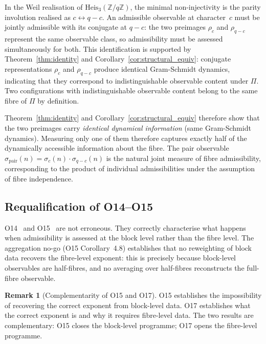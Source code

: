 \documentclass[11pt,a4paper]{article}
\theoremstyle{definition}
\newtheorem{remark}[theorem]{Remark}
\newcommand{\Heis}{\mathrm{Heis}_3}
\newcommand{\ZqZ}{\mathbb{Z}/q\mathbb{Z}}
\begin{document}
      In the Weil realisation of $\Heis(\ZqZ)$, the minimal non-injectivity
      is the parity involution realised as $c \leftrightarrow q-c$.
      An admissible observable at character~$c$ must be jointly
      admissible with its conjugate at $q-c$: the two preimages
      $\rho_c$ and $\rho_{q-c}$ represent the same observable class,
      so admissibility must be assessed simultaneously for both.
      This identification is supported by
      Theorem~\ref{thm:identity} and Corollary~\ref{cor:structural_equiv}:
      conjugate representations $\rho_c$ and $\rho_{q-c}$ produce
      identical Gram-Schmidt dynamics, indicating that they correspond to
      indistinguishable observable content under $\Pi$.
      Two configurations with indistinguishable observable content
      belong to the same fibre of $\Pi$ by definition.

      Theorem~\ref{thm:identity} and Corollary~\ref{cor:structural_equiv}
      therefore show that the two preimages carry
      \emph{identical dynamical information} (same Gram-Schmidt dynamics).
      Measuring only one of them therefore captures exactly
      half of the dynamically accessible information about the fibre.
      The pair observable $\sigma_{\mathrm{pair}}(n) = \sigma_c(n) \cdot \sigma_{q-c}(n)$
      is the natural joint measure of fibre admissibility, corresponding
      to the product of individual admissibilities under the assumption
      of fibre independence.

    \subsection{Requalification of O14--O15}

      O14~\cite{Beau2026a18} and O15~\cite{Beau2026a19} are not
      erroneous.
      They correctly characterise what happens when admissibility is
      assessed at the block level rather than the fibre level.
      The aggregation no-go (O15 Corollary~4.8) establishes that
      no reweighting of block data recovers the fibre-level exponent:
      this is precisely because block-level observables are
      half-fibres, and no averaging over half-fibres reconstructs
      the full-fibre observable.

      \begin{remark}[Complementarity of O15 and O17]
O15 establishes the impossibility of recovering the correct
exponent from block-level data.
O17 establishes what the correct exponent is and why it requires
fibre-level data.
The two results are complementary: O15 closes the block-level
programme; O17 opens the fibre-level programme.
      \end{remark}
\end{document}
